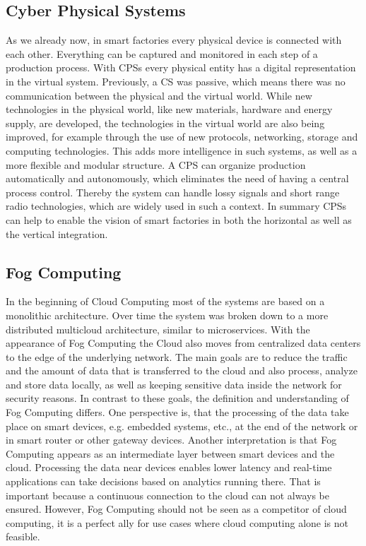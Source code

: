 \subsection{Cyber Physical Systems}
As we already now, in smart factories every physical device is connected with each other.
Everything can be captured and monitored in each step of a production process.
With \acp{CPS} every physical entity has a digital representation in the virtual system.\autocite[cf.][p. 1363]{Poovendran:2010}
Previously, a \ac{CS} was passive, which means there was no communication between the physical and the virtual world.\autocite[cf.][p. 1364]{Poovendran:2010}
While new technologies in the physical world, like new materials, hardware and energy supply, are developed, the technologies in the virtual world are also being improved, for example through the use of new protocols, networking, storage and computing technologies.\autocite[cf.][p. 1364]{Poovendran:2010}
This adds more intelligence in such systems, as well as a more flexible and modular structure.
A \ac{CPS} can organize production automatically and autonomously, which eliminates the need of having a central process control.\autocite[cf.]{Lom:2016}
Thereby the system can handle lossy signals and short range radio technologies, which are widely used in such a context.\autocite[cf.]{Yannuzzi:2014}
In summary \acp{CPS} can help to enable the vision of smart factories in both the horizontal as well as the vertical integration.


\subsection{Fog Computing}
In the beginning of Cloud Computing most of the systems are based on a monolithic architecture.
Over time the system was broken down to a more distributed multicloud architecture, similar to microservices.
With the appearance of Fog Computing the Cloud also moves from centralized data centers to the edge of the underlying network.
The main goals are to reduce the traffic and the amount of data that is transferred to the cloud and also process, analyze and store data locally, as well as keeping sensitive data inside the network for security reasons.\autocite[cf.][p. 236]{Brito:2016}\autocite[cf.][p. 325]{Yannuzzi:2014}\autocite[cf.][p. 4]{Lom:2016}
In contrast to these goals, the definition and understanding of Fog Computing differs.
One perspective is, that the processing of the data take place on smart devices, e.g. embedded systems, etc., at the end of the network or in smart router or other gateway devices.\autocite[cf.][p. 4]{Lom:2016}
Another interpretation is that Fog Computing appears as an intermediate layer between smart devices and the cloud.\autocite[cf.][p. 236]{Brito:2016}
Processing the data near devices enables lower latency and real-time applications can take decisions based on analytics running there.
That is important because a continuous connection to the cloud can not always be ensured.
However, Fog Computing should not be seen as a competitor of cloud computing, it is a perfect ally for use cases where cloud computing alone is not feasible.\autocite[cf.][p. 325]{Yannuzzi:2014}


